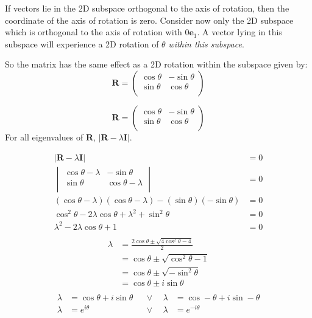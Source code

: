 \documentclass[10pt,oneside,a4paper]{article}
\begin{document}
\begin{enumerate}
If vectors lie in the 2D subspace orthogonal to the axis of rotation, then the
coordinate of the axis of rotation is zero. Consider now only the 2D subspace which
is orthogonal to the axis of rotation with $0\mathbf{e}_1$. A vector lying in
this subspace will experience a 2D rotation of $\theta$ \textit{within this subspace}.

So the matrix has the same effect as a 2D rotation within the subspace given by:
\[
\mathbf{R} =
\begin{pmatrix}
\cos\theta & -\sin\theta \\
\sin\theta & \cos\theta \\
\end{pmatrix}
\]

\[
\mathbf{R} =
\begin{pmatrix}
\cos \theta & -\sin \theta \\
\sin \theta & \cos \theta \\
\end{pmatrix}
\]
For all eigenvalues of $\mathbf{R}$, $|\mathbf{R} - \lambda \mathbf{I}|$.

\[
\begin{split}
|\mathbf{R} - \lambda\mathbf{I}| &= 0 \\
\begin{vmatrix}
\cos\theta - \lambda & -\sin\theta \\
\sin\theta & \cos\theta - \lambda \\
\end{vmatrix}
&= 0 \\
(\cos\theta - \lambda)(\cos\theta - \lambda) - (\sin\theta)(-\sin\theta) &= 0 \\
\cos^2\theta - 2\lambda \cos\theta + \lambda^2 + \sin^2\theta &= 0 \\
\lambda^2 - 2\lambda \cos\theta + 1 &= 0 \\
\end{split}
\]
\[
\begin{split}
\lambda &= \frac{2\cos\theta \pm \sqrt {4\cos^2\theta - 4}}{2} \\
&= \cos\theta \pm \sqrt {\cos^2\theta - 1} \\
&= \cos\theta \pm \sqrt {-\sin^2\theta} \\
&= \cos\theta \pm i\sin\theta \\
\end{split}
\]
\begin{align*}
\lambda &= \cos\theta + i\sin\theta & & \vee \ \ & \lambda &= \cos -\theta + i\sin -\theta \\
\lambda &= e^{i\theta} & & \vee \ \ & \lambda &= e^{-i\theta} \\
\end{align*}


\end{enumerate}
\end{document}
